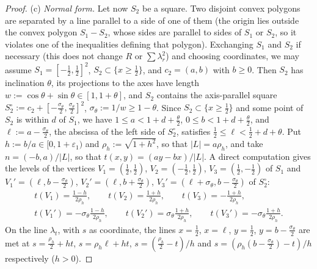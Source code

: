 \documentclass[11pt]{amsart}
\theoremstyle{definition}
\theoremstyle{remark}
\begin{document}
\begin{proof}
(c) \emph{Normal form.} Let now $S_2$ be a square. Two disjoint convex polygons are separated by a line parallel to a side of
one of them (the origin lies outside the convex polygon $S_1-S_2$, whose sides are parallel to sides of $S_1$ or $S_2$, so it
violates one of the inequalities defining that polygon). Exchanging $S_1$ and $S_2$ if necessary (this does not change $R$ or
$\sum\lambda_r^2$) and choosing coordinates, we may assume $S_1=[-\frac12,\frac12]^2$, $S_2\subset\{x\ge\frac12\}$, and $c_2=(a,b)$ with
$b\ge0$. Then $S_2$ has inclination $\theta$, its projections to the axes have length $w:=\cos\theta+\sin\theta\in[1,1+\theta]$, and
$S_2$ contains the axis-parallel square $S_2^\circ:=c_2+[-\frac{\sigma_\theta}2,\frac{\sigma_\theta}2]^2$, $\sigma_\theta:=1/w\ge1-\theta$. Since
$S_2\subset\{x\ge\frac12\}$ and some point of $S_2$ is within $d$ of $S_1$, we have $1\le a<1+d+\frac\theta2$, $0\le b<1+d+\frac\theta2$, and
$\ell:=a-\frac{\sigma_\theta}2$, the abscissa of the left side of $S_2^\circ$, satisfies $\frac12\le\ell<\frac12+d+\theta$. Put
$h:=b/a\in[0,1+\varepsilon_1)$ and $\rho_h:=\sqrt{1+h^2}$, so that $|L|=a\rho_h$, and take $n=(-b,a)/|L|$, so that
$t(x,y)=(ay-bx)/|L|$. A direct computation gives the levels of the vertices $V_1=(\frac12,\frac12)$, $V_2=(-\frac12,\frac12)$,
$V_3=(\frac12,-\frac12)$ of $S_1$ and $V_1'=(\ell,b-\frac{\sigma_\theta}2)$, $V_2'=(\ell,b+\frac{\sigma_\theta}2)$,
$V_3'=(\ell+\sigma_\theta,b-\frac{\sigma_\theta}2)$ of $S_2^\circ$:
\begin{gather*}
t(V_1)=\tfrac{1-h}{2\rho_h},\qquad t(V_2)=\tfrac{1+h}{2\rho_h},\qquad t(V_3)=-\tfrac{1+h}{2\rho_h},\\
t(V_1')=-\sigma_\theta\tfrac{1-h}{2\rho_h},\qquad t(V_2')=\sigma_\theta\tfrac{1+h}{2\rho_h},\qquad t(V_3')=-\sigma_\theta\tfrac{1+h}{2\rho_h}.
\end{gather*}
On the line $\lambda_t$, with $s$ as coordinate, the lines $x=\frac12$, $x=\ell$, $y=\frac12$, $y=b-\frac{\sigma_\theta}2$ are met at
$s=\frac{\rho_h}2+ht$, $s=\rho_h\ell+ht$, $s=(\frac{\rho_h}2-t)/h$ and $s=(\rho_h(b-\frac{\sigma_\theta}2)-t)/h$ respectively ($h>0$).


\end{proof}
\end{document}
